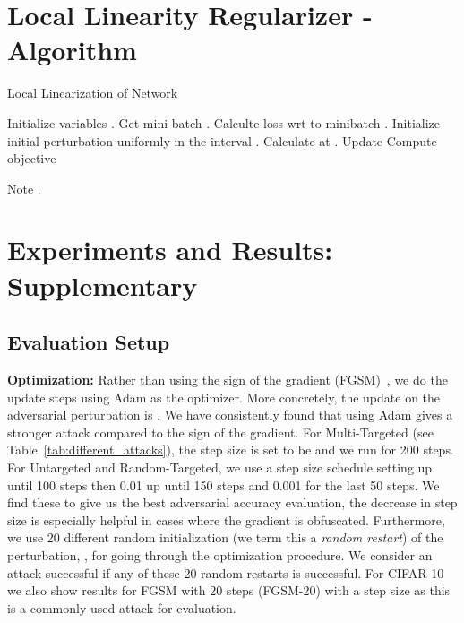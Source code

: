 \documentclass{article}
\theoremstyle{plain}
\theoremstyle{definition}
\theoremstyle{remark}
\begin{document}
\section{Local Linearity Regularizer - Algorithm}\label{app:LLR}
\begin{algorithm}[htb]
  \caption{Local Linearization of Network}
  \begin{algorithmic}[1]
    \STATE Initialize variables . 
    \FORALL{ }
    \STATE Get mini-batch .
    \STATE Calculte loss wrt to minibatch .
    \STATE Initialize initial perturbation  uniformly in the interval .
	\FORALL{ }
	\STATE Calculate  at .
	\STATE Update 
    \ENDFOR
    \STATE Compute objective 
    \STATE 
    \ENDFOR
  \end{algorithmic}
  \label{alg:learning}
\end{algorithm}
Note .
\section{Experiments and Results: Supplementary}
\subsection{Evaluation Setup}\label{sec:optimization}
\textbf{Optimization:} Rather than using the sign of the gradient (FGSM)~\citep{goodfellow2014explaining}, we do the update steps using Adam \citep{kingma2014adam} as the optimizer. More concretely, the update on the adversarial perturbation is . We have consistently found that using Adam gives a stronger attack compared to the sign of the gradient. For Multi-Targeted (see Table~\ref{tab:different_attacks}), the step size is set to be  and we run for 200 steps. For Untargeted and Random-Targeted, we use a step size schedule setting  up until 100 steps then 0.01 up until 150 steps and 0.001 for the last 50 steps. We find these to give us the best adversarial accuracy evaluation, the decrease in step size is especially helpful in cases where the gradient is obfuscated. Furthermore, we use 20 different random initialization (we term this a {\it random restart}) of the perturbation, , for going through the optimization procedure. We consider an attack successful if any of these 20 random restarts is successful. For CIFAR-10 we also show results for FGSM with 20 steps (FGSM-20) with a step size  as this is a commonly used attack for evaluation.
\end{document}
